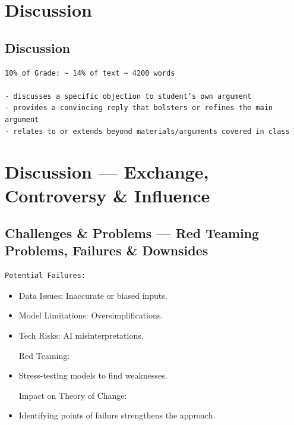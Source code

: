 \documentclass[
  letterpaper,
]{book}
\begin{document}

\chapter{Discussion}\label{discussion}

\section{Discussion}\label{discussion-1}

\begin{verbatim}
10% of Grade: ~ 14% of text ~ 4200 words

- discusses a specific objection to student’s own argument
- provides a convincing reply that bolsters or refines the main argument
- relates to or extends beyond materials/arguments covered in class
\end{verbatim}


\chapter{Discussion --- Exchange, Controversy \&
Influence}\label{discussion-exchange-controversy-influence}

\section{Challenges \& Problems --- Red Teaming Problems, Failures \&
Downsides}\label{challenges-problems-red-teaming-problems-failures-downsides}

\begin{verbatim}
Potential Failures:
\end{verbatim}

\begin{itemize}
\item
  Data Issues: Inaccurate or biased inputs.\\
\item
  Model Limitations: Oversimplifications.\\
\item
  Tech Risks: AI misinterpretations.

  Red Teaming:
\item
  Stress-testing models to find weaknesses.

  Impact on Theory of Change:
\item
  Identifying points of failure strengthens the approach.
\end{itemize}
\end{document}
